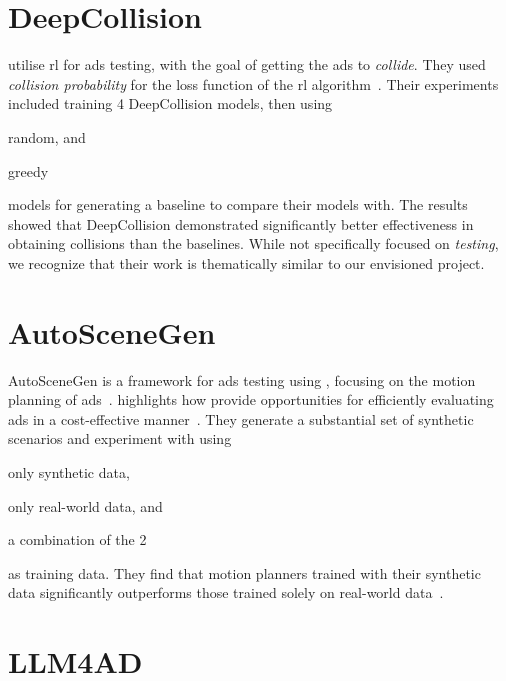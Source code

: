 \section{DeepCollision}

\citeauthor{deepCollision} utilise \acrfull{rl} for \acrshort{ads} testing, with the goal of getting
the \acrshort{ads} to \textit{collide}. They used \textit{collision probability} for the loss
function of the \acrlong{rl} algorithm~\cite[384]{deepCollision}. Their experiments included
training 4 DeepCollision models, then using \begin{inparaenum}
  \item random, and
  \item greedy
\end{inparaenum} models for generating a baseline to compare their models with. The results showed
that DeepCollision demonstrated significantly better effectiveness in obtaining collisions than the
baselines. While not specifically focused on \textit{testing}, we recognize that their work is thematically
similar to our envisioned project.

\section{AutoSceneGen}\label{sec:autoSceneGen}

AutoSceneGen is a framework for \acrshort{ads} testing using ,
focusing on the motion planning of \acrlong{ads}~\cite[14539]{autoSceneGen}.
\citeauthor{autoSceneGen} highlights how  provide opportunities
for efficiently evaluating \acrshort{ads} in a cost-effective
manner~\cite[14539-14540]{autoSceneGen}. They generate a substantial set of synthetic scenarios and
experiment with using \begin{inparaenum}
  \item only synthetic data,
  \item only real-world data, and
  \item a combination of the \num{2} \end{inparaenum} as training data. They find that motion
planners trained with their synthetic data significantly outperforms those trained solely on
real-world data~\cite[14539]{autoSceneGen}.

\section{LLM4AD}

